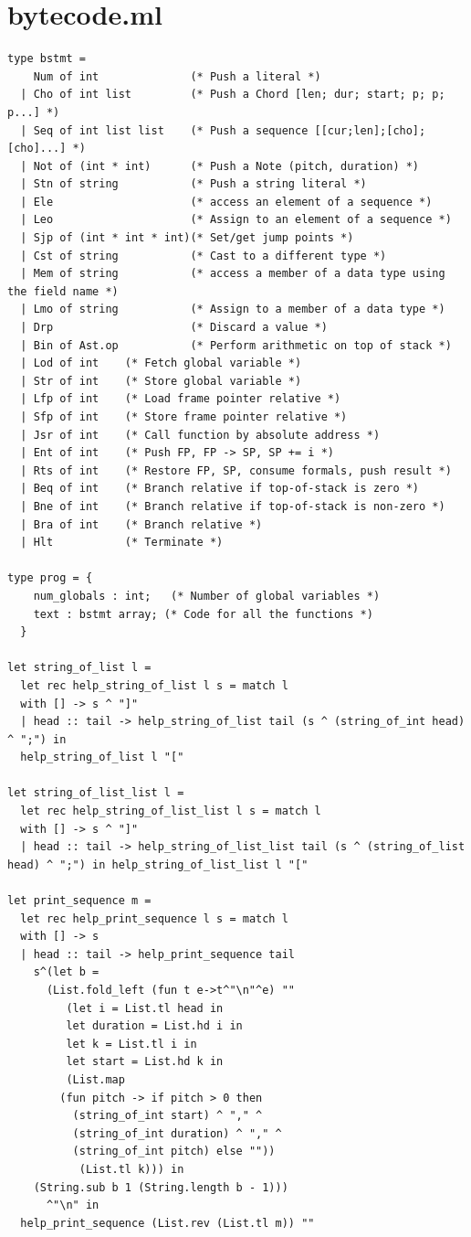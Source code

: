 \documentclass[12pt,A4]{book}
\begin{document}
\section{bytecode.ml}
\begin{verbatim}
type bstmt =
    Num of int              (* Push a literal *)
  | Cho of int list         (* Push a Chord [len; dur; start; p; p; p...] *)
  | Seq of int list list    (* Push a sequence [[cur;len];[cho];[cho]...] *)
  | Not of (int * int)      (* Push a Note (pitch, duration) *)
  | Stn of string           (* Push a string literal *)
  | Ele                     (* access an element of a sequence *)
  | Leo                     (* Assign to an element of a sequence *)
  | Sjp of (int * int * int)(* Set/get jump points *)
  | Cst of string           (* Cast to a different type *)
  | Mem of string           (* access a member of a data type using the field name *)
  | Lmo of string           (* Assign to a member of a data type *)
  | Drp                     (* Discard a value *)
  | Bin of Ast.op           (* Perform arithmetic on top of stack *)
  | Lod of int    (* Fetch global variable *)
  | Str of int    (* Store global variable *)
  | Lfp of int    (* Load frame pointer relative *)
  | Sfp of int    (* Store frame pointer relative *)
  | Jsr of int    (* Call function by absolute address *)
  | Ent of int    (* Push FP, FP -> SP, SP += i *)
  | Rts of int    (* Restore FP, SP, consume formals, push result *)
  | Beq of int    (* Branch relative if top-of-stack is zero *)
  | Bne of int    (* Branch relative if top-of-stack is non-zero *)
  | Bra of int    (* Branch relative *)
  | Hlt           (* Terminate *)

type prog = {
    num_globals : int;   (* Number of global variables *)
    text : bstmt array; (* Code for all the functions *)
  }
  
let string_of_list l = 
  let rec help_string_of_list l s = match l
  with [] -> s ^ "]"
  | head :: tail -> help_string_of_list tail (s ^ (string_of_int head) ^ ";") in
  help_string_of_list l "["
    
let string_of_list_list l =
  let rec help_string_of_list_list l s = match l
  with [] -> s ^ "]"
  | head :: tail -> help_string_of_list_list tail (s ^ (string_of_list head) ^ ";") in help_string_of_list_list l "["
    
let print_sequence m = 
  let rec help_print_sequence l s = match l 
  with [] -> s 
  | head :: tail -> help_print_sequence tail 
	s^(let b = 
	  (List.fold_left (fun t e->t^"\n"^e) "" 
	     (let i = List.tl head in 
	     let duration = List.hd i in 
	     let k = List.tl i in 
	     let start = List.hd k in 
	     (List.map 
		(fun pitch -> if pitch > 0 then
		  (string_of_int start) ^ "," ^ 
		  (string_of_int duration) ^ "," ^ 
		  (string_of_int pitch) else ""))
	       (List.tl k))) in 
	(String.sub b 1 (String.length b - 1)))
      ^"\n" in 
  help_print_sequence (List.rev (List.tl m)) ""
    

\end{verbatim}
\end{document}
